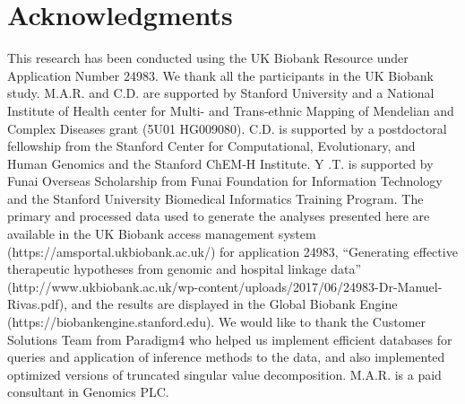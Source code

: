 \section*{Acknowledgments}
This research has been conducted using the UK Biobank Resource under Application Number 24983. We thank all the participants in the UK Biobank study. M.A.R. and C.D. are supported by Stanford University and a National Institute of Health center for Multi- and Trans-ethnic Mapping of Mendelian and Complex Diseases grant (5U01 HG009080). C.D. is supported by a postdoctoral fellowship from the Stanford Center for Computational, Evolutionary, and Human Genomics and the Stanford ChEM-H Institute. Y .T. is supported by Funai Overseas Scholarship from Funai Foundation for Information Technology and the Stanford University Biomedical Informatics Training Program. The primary and processed data used to generate the analyses presented here are available in the UK Biobank access management system (https://amsportal.ukbiobank.ac.uk/) for application 24983, ``Generating effective therapeutic hypotheses from genomic and hospital linkage data'' (http://www.ukbiobank.ac.uk/wp-content/uploads/2017/06/24983-Dr-Manuel-Rivas.pdf), and the results are displayed in the Global Biobank Engine (https://biobankengine.stanford.edu). We would like to thank the Customer Solutions Team from Paradigm4 who helped us implement efficient databases for queries and application of inference methods to the data, and also implemented optimized versions of truncated singular value decomposition. M.A.R. is a paid consultant in Genomics PLC.

\nolinenumbers

% 

%
%
% 

